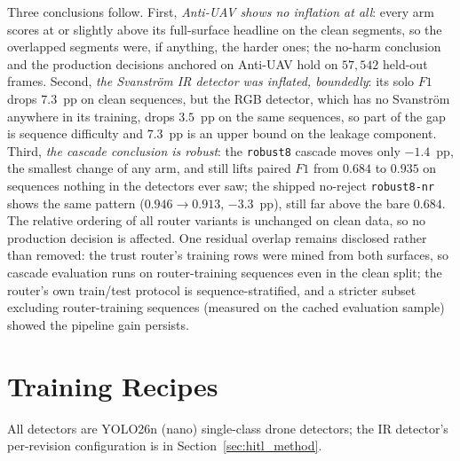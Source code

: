 Three conclusions follow. First, \emph{Anti-UAV shows no inflation at all}: every arm scores at or slightly above its full-surface headline on the clean segments, so the overlapped segments were, if anything, the harder ones; the no-harm conclusion and the production decisions anchored on Anti-UAV hold on $57{,}542$ held-out frames. Second, \emph{the Svanstr\"om IR detector was inflated, boundedly}: its solo $F1$ drops $7.3$~pp on clean sequences, but the RGB detector, which has no Svanstr\"om anywhere in its training, drops $3.5$~pp on the same sequences, so part of the gap is sequence difficulty and $7.3$~pp is an upper bound on the leakage component. Third, \emph{the cascade conclusion is robust}: the \texttt{robust8} cascade moves only $-1.4$~pp, the smallest change of any arm, and still lifts paired $F1$ from $0.684$ to $0.935$ on sequences nothing in the detectors ever saw; the shipped no-reject \texttt{robust8-nr} shows the same pattern ($0.946 \to 0.913$, $-3.3$~pp), still far above the bare $0.684$. The relative ordering of all router variants is unchanged on clean data, so no production decision is affected. One residual overlap remains disclosed rather than removed: the trust router's training rows were mined from both surfaces, so cascade evaluation runs on router-training sequences even in the clean split; the router's own train/test protocol is sequence-stratified, and a stricter subset excluding router-training sequences (measured on the cached evaluation sample) showed the pipeline gain persists.

\section{Training Recipes}
\label{sec:training_recipes}

All detectors are YOLO26n (nano) single-class drone detectors; the IR detector's per-revision configuration is in Section~\ref{sec:hitl_method}.

